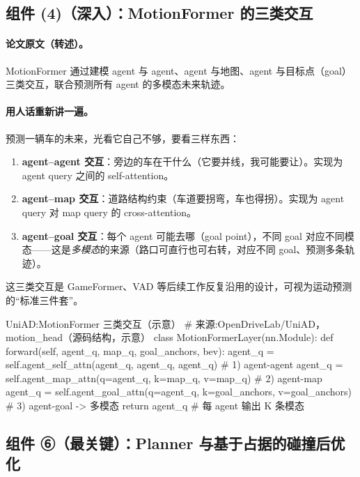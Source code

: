 \subsection{组件 (4)（深入）：MotionFormer 的三类交互}
\label{sec:de-motionformer}

\paragraph{论文原文（转述）。}
MotionFormer 通过建模 agent 与 agent、agent 与地图、agent 与目标点（goal）三类交互，联合预测所有 agent 的多模态未来轨迹\cite{hu2023uniad}。

\paragraph{用人话重新讲一遍。}
预测一辆车的未来，光看它自己不够，要看三样东西：
\begin{enumerate}
  \item \textbf{agent--agent 交互}：旁边的车在干什么（它要并线，我可能要让）。实现为 agent query 之间的 self-attention。
  \item \textbf{agent--map 交互}：道路结构约束（车道要拐弯，车也得拐）。实现为 agent query 对 map query 的 cross-attention。
  \item \textbf{agent--goal 交互}：每个 agent 可能去哪（goal point），不同 goal 对应不同模态——这是\emph{多模态}的来源（路口可直行也可右转，对应不同 goal、预测多条轨迹）。
\end{enumerate}
这三类交互是 GameFormer、VAD 等后续工作反复沿用的设计，可视为运动预测的“标准三件套”。

\begin{codebox}[Python]{UniAD:MotionFormer 三类交互（示意）}
# 来源:OpenDriveLab/UniAD，motion_head（源码结构，示意）
class MotionFormerLayer(nn.Module):
    def forward(self, agent_q, map_q, goal_anchors, bev):
        agent_q = self.agent_self_attn(agent_q, agent_q, agent_q)        # 1) agent-agent
        agent_q = self.agent_map_attn(q=agent_q, k=map_q, v=map_q)       # 2) agent-map
        agent_q = self.agent_goal_attn(q=agent_q, k=goal_anchors,
                                       v=goal_anchors)                   # 3) agent-goal -> 多模态
        return agent_q                                                   # 每 agent 输出 K 条模态
\end{codebox}

\subsection{组件 ⑥（最关键）：Planner 与基于占据的碰撞后优化}
\label{sec:de-collision}

